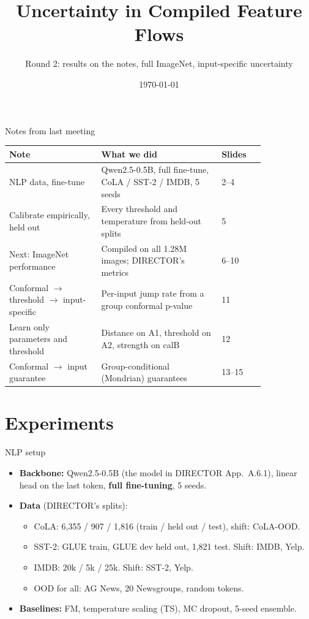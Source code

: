 \documentclass[aspectratio=169,11pt]{beamer}
\title{Uncertainty in Compiled Feature Flows}
\subtitle{Round 2: results on the notes, full ImageNet, input-specific uncertainty}
\author{} %
\institute{Meeting with Prof.~Nghia}
\date{\today}
\begin{document}
\maketitle

\begin{frame}{Notes from last meeting}
  \small
  \begin{tabular}{@{}p{0.36\linewidth}p{0.47\linewidth}l@{}}
    \toprule
    Note & What we did & Slides\\
    \midrule
    NLP data, fine-tune & Qwen2.5-0.5B, full fine-tune, CoLA / SST-2 / IMDB, 5 seeds & 2--4\\
    Calibrate empirically, held out & Every threshold and temperature from held-out splits & 5\\
    Next: ImageNet performance & Compiled on all 1.28M images; DIRECTOR's metrics & 6--10\\
    Conformal $\to$ threshold $\to$ input-specific & Per-input jump rate from a group conformal p-value & 11\\
    Learn only parameters and threshold & Distance on A1, threshold on A2, strength on calB & 12\\
    Conformal $\to$ input guarantee & Group-conditional (Mondrian) guarantees & 13--15\\
    \bottomrule
  \end{tabular}
\end{frame}

\section{Experiments}

\begin{frame}{NLP setup}
  \small
  \begin{itemize}
    \item \textbf{Backbone:} Qwen2.5-0.5B (the model in DIRECTOR App.~A.6.1), linear head on the last token, \textbf{full fine-tuning}, 5 seeds.
    \item \textbf{Data} (DIRECTOR's splits):
      \begin{itemize}\small
        \item CoLA: 6,355 / 907 / 1,816 (train / held out / test), shift: CoLA-OOD.
        \item SST-2: GLUE train, GLUE dev held out, 1,821 test. Shift: IMDB, Yelp.
        \item IMDB: 20k / 5k / 25k. Shift: SST-2, Yelp.
        \item OOD for all: AG News, 20 Newsgroups, random tokens.
      \end{itemize}
    \item \textbf{Baselines:} FM, temperature scaling (TS), MC dropout, 5-seed ensemble.
  \end{itemize}
\end{frame}
\end{document}
